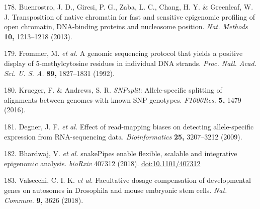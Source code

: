 \documentclass[11pt,twoside]{MPIthesis}
\theoremstyle{definition}
\theoremstyle{definition}
\theoremstyle{definition}
\theoremstyle{remark}
\begin{document}
178. Buenrostro, J. D., Giresi, P. G., Zaba, L. C., Chang, H. Y. \&
Greenleaf, W. J. Transposition of native chromatin for fast and
sensitive epigenomic profiling of open chromatin, DNA-binding proteins
and nucleosome position. \emph{Nat. Methods} \textbf{10,} 1213--1218
(2013).

179. Frommer, M. \emph{et al.} A genomic sequencing protocol that yields
a positive display of 5-methylcytosine residues in individual DNA
strands. \emph{Proc. Natl. Acad. Sci. U. S. A.} \textbf{89,} 1827--1831
(1992).

180. Krueger, F. \& Andrews, S. R. \emph{SNPsplit}: Allele-specific
splitting of alignments between genomes with known SNP genotypes.
\emph{F1000Res.} \textbf{5,} 1479 (2016).

181. Degner, J. F. \emph{et al.} Effect of read-mapping biases on
detecting allele-specific expression from RNA-sequencing data.
\emph{Bioinformatics} \textbf{25,} 3207--3212 (2009).

182. Bhardwaj, V. \emph{et al.} snakePipes enable flexible, scalable and
integrative epigenomic analysis. \emph{bioRxiv} 407312 (2018).
\url{doi:10.1101/407312}

183. Valsecchi, C. I. K. \emph{et al.} Facultative dosage compensation
of developmental genes on autosomes in Drosophila and mouse embryonic
stem cells. \emph{Nat. Commun.} \textbf{9,} 3626 (2018).


\end{document}
